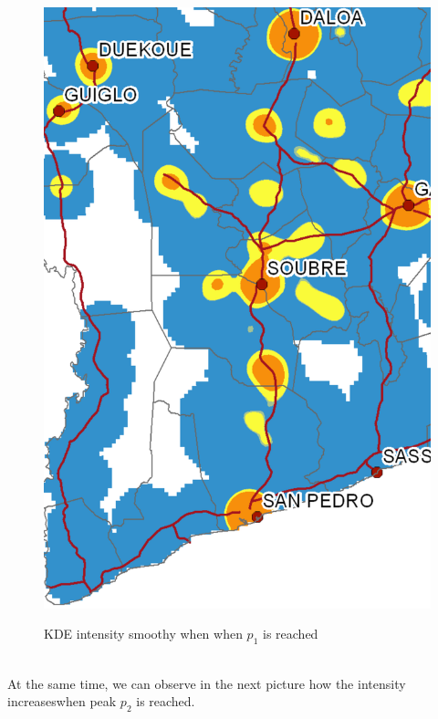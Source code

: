 \begin{figure}
{    \includegraphics[scale = 0.15]{results/images/kernel/l_hour8_kd_detail.pdf}
	\label{fig:subfig2_detail}
}
\caption[KDE intensity smoothy when $p_1$ is reached]{KDE intensity smoothy when when  $p_1$ is reached}
\label{fig:subfigureExample}
\end{figure}


\\

At the same time, we can observe in the next picture how the intensity increaseswhen peak $p_2$ is reached.

\\

